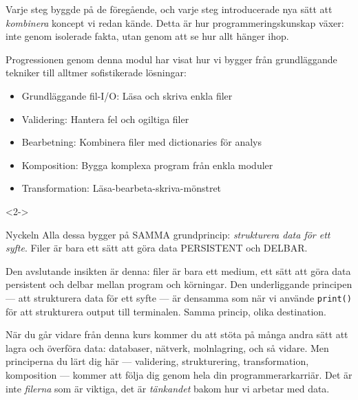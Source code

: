 Varje steg byggde på de föregående, och varje steg introducerade nya sätt att \emph{kombinera} koncept vi redan kände. Detta är hur programmeringskunskap växer: inte genom isolerade fakta, utan genom att se hur allt hänger ihop.

\begin{frame}
  \begin{remark}
    Progressionen genom denna modul har visat hur vi bygger från grundläggande
    tekniker till alltmer sofistikerade lösningar:
    \begin{itemize}
      \item Grundläggande fil-I/O: Läsa och skriva enkla filer
      \item Validering: Hantera fel och ogiltiga filer
      \item Bearbetning: Kombinera filer med dictionaries för analys
      \item Komposition: Bygga komplexa program från enkla moduler
      \item Transformation: Läsa-bearbeta-skriva-mönstret
    \end{itemize}
  \end{remark}

  \begin{uncoverenv}<2->
    \begin{block}{Nyckeln}
      Alla dessa bygger på SAMMA grundprincip: \emph{strukturera data för ett
      syfte}. Filer är bara ett sätt att göra data PERSISTENT och DELBAR.
    \end{block}
  \end{uncoverenv}
\end{frame}

Den avslutande insikten är denna: filer är bara ett medium, ett sätt att göra data persistent och delbar mellan program och körningar. Den underliggande principen --- att strukturera data för ett syfte --- är densamma som när vi använde \texttt{print()} för att strukturera output till terminalen. Samma princip, olika destination.

När du går vidare från denna kurs kommer du att stöta på många andra sätt att lagra och överföra data: databaser, nätverk, molnlagring, och så vidare. Men principerna du lärt dig här --- validering, strukturering, transformation, komposition --- kommer att följa dig genom hela din programmerarkarriär. Det är inte \emph{filerna} som är viktiga, det är \emph{tänkandet} bakom hur vi arbetar med data.

